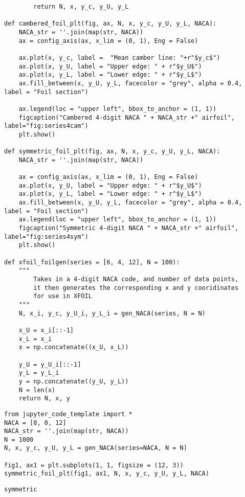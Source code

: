 \documentclass[11pt]{article}
\begin{document}
\begin{lstlisting}
        return N, x, y_c, y_U, y_L

def cambered_foil_plt(fig, ax, N, x, y_c, y_U, y_L, NACA):
    NACA_str = ''.join(map(str, NACA))
    ax = config_axis(ax, x_lim = (0, 1), Eng = False)

    ax.plot(x, y_c, label =  "Mean camber line: "+r"$y_c$")
    ax.plot(x, y_U, label = "Upper edge: " + r"$y_U$")
    ax.plot(x, y_L, label = "Lower edge: " + r"$y_L$")
    ax.fill_between(x, y_U, y_L, facecolor = "grey", alpha = 0.4, label = "Foil section")

    ax.legend(loc = "upper left", bbox_to_anchor = (1, 1))
    figcaption("Cambered 4-digit NACA " + NACA_str +" airfoil", label="fig:series4cam")
    plt.show()
    
def symmetric_foil_plt(fig, ax, N, x, y_c, y_U, y_L, NACA):
    NACA_str = ''.join(map(str, NACA))
    
    ax = config_axis(ax, x_lim = (0, 1), Eng = False)
    ax.plot(x, y_U, label = "Upper edge: " + r"$y_U$")
    ax.plot(x, y_L, label = "Lower edge: " + r"$y_L$")
    ax.fill_between(x, y_U, y_L, facecolor = "grey", alpha = 0.4, label = "Foil section")
    ax.legend(loc = "upper left", bbox_to_anchor = (1, 1))
    figcaption("Symmetric 4-digit NACA " + NACA_str +" airfoil", label="fig:series4sym")
    plt.show()

def xfoil_foilgen(series = [6, 4, 12], N = 100):
    """
        Takes in a 4-digit NACA code, and number of data points,
        it then generates the corresponding x and y cooridinates
        for use in XFOIL
    """
    N, x_i, y_c, y_U_i, y_L_i = gen_NACA(series, N = N)
    
    x_U = x_i[::-1]
    x_L = x_i
    x = np.concatenate((x_U, x_L))
    
    y_U = y_U_i[::-1]
    y_L = y_L_i
    y = np.concatenate((y_U, y_L))
    N = len(x)
    return N, x, y
\end{lstlisting}%
\begin{lstlisting}
from jupyter_code_template import *
NACA = [0, 0, 12]
NACA_str = ''.join(map(str, NACA))
N = 1000
N, x, y_c, y_U, y_L = gen_NACA(series=NACA, N = N)

fig1, ax1 = plt.subplots(1, 1, figsize = (12, 3))
symmetric_foil_plt(fig1, ax1, N, x, y_c, y_U, y_L, NACA)
\end{lstlisting}%
    \begin{Verbatim}[commandchars=\\\{\}]
symmetric

    \end{Verbatim}
\end{document}
